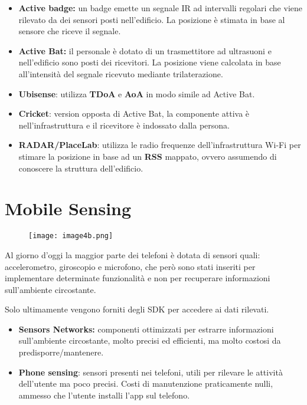 \begin{itemize}
\item \textbf{Active badge:} un badge emette un segnale IR ad intervalli
  regolari che viene rilevato da dei sensori posti nell'edificio. La
  posizione è stimata in base al sensore che riceve il segnale.

\item \textbf{Active Bat:} il personale è dotato di un trasmettitore ad
  ultrasuoni e nell'edificio sono posti dei ricevitori. La posizione
  viene calcolata in base all'intensità del segnale ricevuto mediante
  trilaterazione.

\item \textbf{Ubisense}: utilizza \textbf{TDoA} e \textbf{AoA} in modo
  simile ad Active Bat.

\item \textbf{Cricket}: version opposta di Active Bat, la componente attiva
  è nell'infrastruttura e il ricevitore è indossato dalla persona.

\item \textbf{RADAR/PlaceLab}: utilizza le radio frequenze
  dell'infrastruttura Wi-Fi per stimare la posizione in base ad un
  \textbf{RSS} mappato, ovvero assumendo di conoscere la struttura
  dell'edificio.

\end{itemize}

\section{Mobile Sensing}\label{mobile-sensing}

\begin{figure}[H]
 \centering
 \texttt{[image: image4b.png]}
\end{figure}

Al giorno d'oggi la maggior parte dei telefoni è dotata di sensori
quali: accelerometro, giroscopio e microfono, che però sono stati
inseriti per implementare determinate funzionalità e non per recuperare
informazioni sull'ambiente circostante.

Solo ultimamente vengono forniti degli SDK per accedere ai dati
rilevati.

\begin{itemize}
\item \textbf{Sensors Networks:} componenti ottimizzati per estrarre
  informazioni sull'ambiente circostante, molto precisi ed efficienti,
  ma molto costosi da predisporre/mantenere.

\item \textbf{Phone sensing}: sensori presenti nei telefoni, utili per
  rilevare le attività dell'utente ma poco precisi. Costi di
  manutenzione praticamente nulli, ammesso che l'utente installi l'app
  sul telefono.

\end{itemize}

